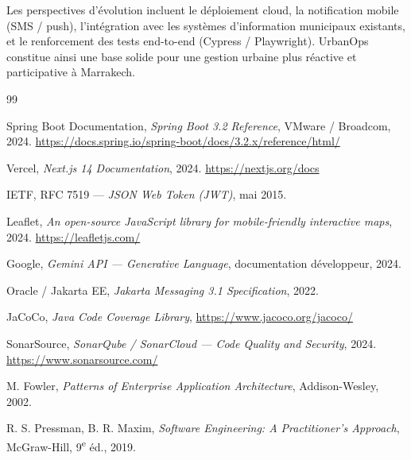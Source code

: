 \documentclass[12pt,a4paper,oneside]{report}
\begin{document}
Les perspectives d'évolution incluent le déploiement cloud, la notification mobile (SMS / push), l'intégration avec les systèmes d'information municipaux existants, et le renforcement des tests end-to-end (Cypress / Playwright). UrbanOps constitue ainsi une base solide pour une gestion urbaine plus réactive et participative à Marrakech.

\begin{thebibliography}{99}

Spring Boot Documentation, \textit{Spring Boot 3.2 Reference}, VMware / Broadcom, 2024.
\url{https://docs.spring.io/spring-boot/docs/3.2.x/reference/html/}

Vercel, \textit{Next.js 14 Documentation}, 2024.
\url{https://nextjs.org/docs}

IETF, RFC 7519 — \textit{JSON Web Token (JWT)}, mai 2015.

Leaflet, \textit{An open-source JavaScript library for mobile-friendly interactive maps}, 2024.
\url{https://leafletjs.com/}

Google, \textit{Gemini API — Generative Language}, documentation développeur, 2024.

Oracle / Jakarta EE, \textit{Jakarta Messaging 3.1 Specification}, 2022.

JaCoCo, \textit{Java Code Coverage Library}, \url{https://www.jacoco.org/jacoco/}

SonarSource, \textit{SonarQube / SonarCloud — Code Quality and Security}, 2024.
\url{https://www.sonarsource.com/}

M. Fowler, \textit{Patterns of Enterprise Application Architecture}, Addison-Wesley, 2002.

R. S. Pressman, B. R. Maxim, \textit{Software Engineering: A Practitioner's Approach}, McGraw-Hill, 9\textsuperscript{e} éd., 2019.

\end{thebibliography}
\end{document}
